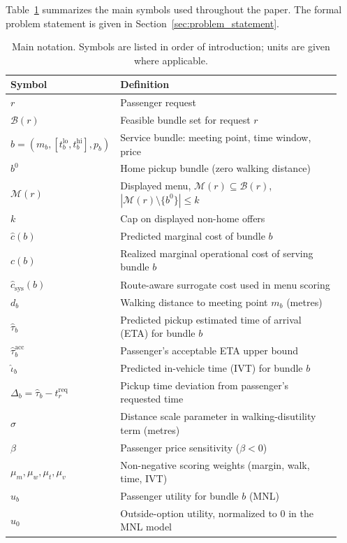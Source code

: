 Table~\ref{tab:notation} summarizes the main symbols used throughout the paper. The formal problem statement is given in Section~\ref{sec:problem_statement}.

\begin{table}[t]
\centering
\small
\caption{Main notation. Symbols are listed in order of introduction; units are given where applicable.}
\label{tab:notation}
\begin{tabular}{@{}p{0.20\linewidth}p{0.74\linewidth}@{}}
\hline
Symbol & Definition \\
\hline
$r$ & Passenger request \\
$\mathcal{B}(r)$ & Feasible bundle set for request $r$ \\
$b = (m_b, [t_b^{\text{lo}}, t_b^{\text{hi}}], p_b)$ & Service bundle: meeting point, time window, price \\
$b^0$ & Home pickup bundle (zero walking distance) \\
$\mathcal{M}(r)$ & Displayed menu, $\mathcal{M}(r) \subseteq \mathcal{B}(r)$, $|\mathcal{M}(r) \setminus \{b^0\}| \leq k$ \\
$k$ & Cap on displayed non-home offers \\
$\hat{c}(b)$ & Predicted marginal cost of bundle $b$ \\
$c(b)$ & Realized marginal operational cost of serving bundle $b$ \\
$\hat{c}_{\text{sys}}(b)$ & Route-aware surrogate cost used in menu scoring \\
$d_b$ & Walking distance to meeting point $m_b$ (metres) \\
$\hat{\tau}_b$ & Predicted pickup estimated time of arrival (ETA) for bundle $b$ \\
$\hat{\tau}_b^{\text{acc}}$ & Passenger's acceptable ETA upper bound \\
$\hat{\iota}_b$ & Predicted in-vehicle time (IVT) for bundle $b$ \\
$\Delta_b = \hat{\tau}_b - t_r^{\text{req}}$ & Pickup time deviation from passenger's requested time \\
$\sigma$ & Distance scale parameter in walking-disutility term (metres) \\
$\beta$ & Passenger price sensitivity ($\beta < 0$) \\
$\mu_m,\mu_w,\mu_t,\mu_v$ & Non-negative scoring weights (margin, walk, time, IVT) \\
$u_b$ & Passenger utility for bundle $b$ (MNL) \\
$u_0$ & Outside-option utility, normalized to $0$ in the MNL model \\

\end{tabular}
\end{table}
